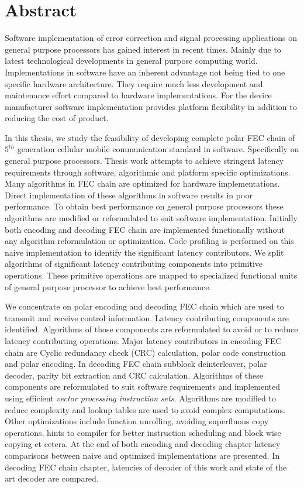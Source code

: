 \chapter*{Abstract}
Software implementation of error correction and signal processing applications on general purpose processors has gained interest in recent times. Mainly due to latest technological developments in general purpose computing world. Implementations in software have an inherent advantage not being tied to one specific hardware architecture. They require much less development and maintenance effort compared to hardware implementations. For the device manufacturer software implementation provides platform flexibility in addition to reducing the cost of product. \newline

In this thesis, we study the feasibility of developing complete polar FEC chain of $5^{th}$ generation cellular mobile communication standard in software. Specifically on general purpose processors. Thesis work attempts to achieve stringent latency requirements through software, algorithmic and platform specific optimizations. Many algorithms in FEC chain are optimized for hardware implementations. Direct implementation of these algorithms in software results in poor performance. To obtain best performance on general purpose processors these algorithms are modified or reformulated to suit software implementation. Initially both encoding and decoding FEC chain are implemented functionally without any algorithm reformulation or optimization. Code profiling is performed on this naive implementation to identify the significant latency contributors. We split algorithms of significant latency contributing components into primitive operations. These primitive operations are mapped to specialized functional units of general purpose processor to achieve best performance. \newline

We concentrate on polar encoding and decoding FEC chain which are used to transmit and receive control information. Latency contributing components are identified. Algorithms of those components are reformulated to avoid or to reduce latency contributing operations. Major latency contributors in encoding FEC chain are Cyclic redundancy check (CRC) calculation, polar code construction and  polar encoding. In decoding FEC chain  subblock deinterleaver, polar decoder, parity bit extraction and CRC calculation. Algorithms of these components are reformulated to suit software requirements and implemented using efficient \emph{vector processing instruction sets}. Algorithms are modified to reduce complexity and lookup tables are used to avoid complex computations. Other optimizations include function unrolling, avoiding superfluous copy operations, hints to compiler for better instruction scheduling and block wise copying et cetera. At the end of both encoding and decoding chapter latency comparisons between naive and optimized implementations are presented. In decoding FEC chain chapter, latencies of decoder of this work and state of the art decoder are compared.